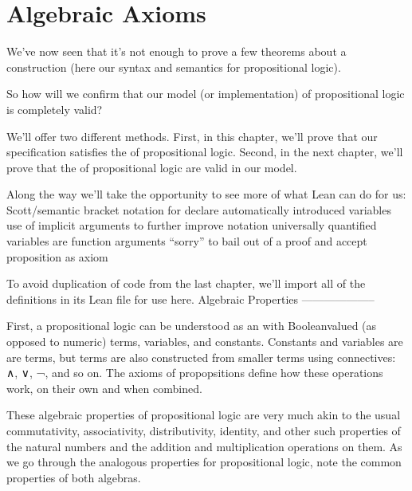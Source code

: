 \documentclass[letterpaper,10pt,english]{sphinxmanual}
\begin{document}
\begin{sphinxVerbatim}[commandchars=\\\{\}]
 
 
\end{sphinxVerbatim}


\section{Algebraic Axioms}
\label{\detokenize{A_01_Propositional_Logic:algebraic-axioms}}
\sphinxAtStartPar
We’ve now seen that it’s not enough to prove a few
theorems about a construction (here our syntax and
semantics for propositional logic).

\sphinxAtStartPar
So how will we confirm  that our model (or
implementation) of propositional logic is completely
valid?

\sphinxAtStartPar
We’ll offer two different methods. First, in this
chapter, we’ll prove that our specification satisfies
the  of propositional logic. Second,
in the next chapter, we’ll prove that the  of propositional logic are valid in our model.

\sphinxAtStartPar
Along the way we’ll take the opportunity to see more
of what Lean can do for us:
\sphinxhyphen{} Scott/semantic bracket notation for 
\sphinxhyphen{} declare automatically introduced variables
\sphinxhyphen{} use of implicit arguments to further improve notation
\sphinxhyphen{} universally quantified variables are function arguments
\sphinxhyphen{} “sorry” to bail out of a proof and accept proposition as axiom

\sphinxAtStartPar
To avoid duplication of code from the last chapter,
we’ll import all of the definitions in its Lean file
for use here.
Algebraic Properties
——————–

\sphinxAtStartPar
First, a propositional logic can be understood as an  with
Boolean\sphinxhyphen{}valued (as opposed to numeric) terms, variables, and constants.
Constants and variables are are terms, but terms are also  constructed
from smaller terms using connectives: ∧, ∨, ¬, and so on. The axioms of
propopsitions define how these operations work, on their own and when
combined.

\sphinxAtStartPar
These algebraic properties of propositional logic are very much akin
to the usual commutativity, associativity, distributivity, identity,
and other such properties of the natural numbers and the addition and
multiplication operations on them. As we go through the analogous
properties for propositional logic, note the common properties of both
algebras.
\end{document}
